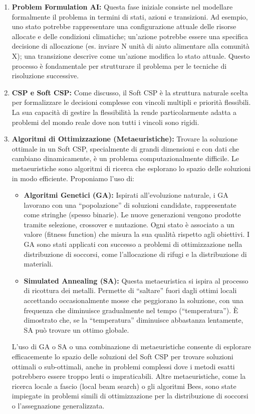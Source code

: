 \documentclass{article}
\begin{document}
\begin{enumerate}
    \item \textbf{Problem Formulation AI:} Questa fase iniziale consiste nel modellare formalmente il problema in termini di stati, azioni e transizioni. Ad esempio, uno stato potrebbe rappresentare una configurazione attuale delle risorse allocate e delle condizioni climatiche; un'azione potrebbe essere una specifica decisione di allocazione (es. inviare N unità di aiuto alimentare alla comunità X); una transizione descrive come un'azione modifica lo stato attuale. Questo processo è fondamentale per strutturare il problema per le tecniche di risoluzione successive.
    
    \item \textbf{CSP e Soft CSP:} Come discusso, il Soft CSP è la struttura naturale scelta per formalizzare le decisioni complesse con vincoli multipli e priorità flessibili. La sua capacità di gestire la flessibilità la rende particolarmente adatta a problemi del mondo reale dove non tutti i vincoli sono rigidi.
    
    \item \textbf{Algoritmi di Ottimizzazione (Metaeuristiche):} Trovare la soluzione ottimale in un Soft CSP, specialmente di grandi dimensioni e con dati che cambiano dinamicamente, è un problema computazionalmente difficile. Le metaeuristiche sono algoritmi di ricerca che esplorano lo spazio delle soluzioni in modo efficiente. Proponiamo l'uso di:
    \begin{itemize}
        \item \textbf{Algoritmi Genetici (GA):} Ispirati all'evoluzione naturale, i GA lavorano con una ``popolazione'' di soluzioni candidate, rappresentate come stringhe (spesso binarie). Le nuove generazioni vengono prodotte tramite selezione, crossover e mutazione. Ogni stato è associato a un valore (fitness function) che misura la sua qualità rispetto agli obiettivi. I GA sono stati applicati con successo a problemi di ottimizzazione nella distribuzione di soccorsi, come l'allocazione di rifugi e la distribuzione di materiali.
        \item \textbf{Simulated Annealing (SA):} Questa metaeuristica si ispira al processo di ricottura dei metalli. Permette di ``saltare'' fuori dagli ottimi locali accettando occasionalmente mosse che peggiorano la soluzione, con una frequenza che diminuisce gradualmente nel tempo (``temperatura''). È dimostrato che, se la ``temperatura'' diminuisce abbastanza lentamente, SA può trovare un ottimo globale.
    \end{itemize}
    L'uso di GA o SA o una combinazione di metaeuristiche consente di esplorare efficacemente lo spazio delle soluzioni del Soft CSP per trovare soluzioni ottimali o sub-ottimali, anche in problemi complessi dove i metodi esatti potrebbero essere troppo lenti o impraticabili. Altre metaeuristiche, come la ricerca locale a fascio (local beam search) o gli algoritmi Bees, sono state impiegate in problemi simili di ottimizzazione per la distribuzione di soccorsi o l'assegnazione generalizzata.
    

\end{enumerate}
\end{document}
